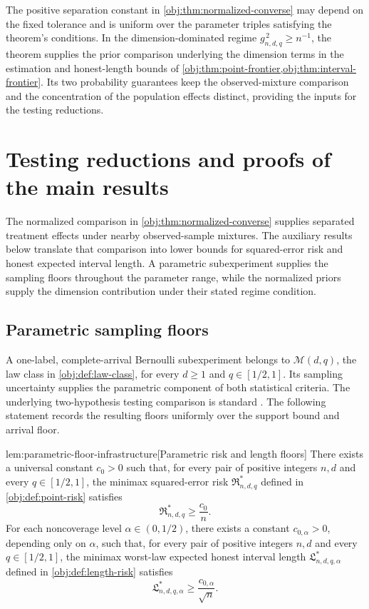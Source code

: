 \documentclass[11pt]{article}
\begin{document}
The positive separation constant  in \cref{obj:thm:normalized-converse} may depend on the fixed tolerance and is uniform over the parameter triples satisfying the theorem's conditions. In the dimension-dominated regime \(g_{n,d,q}^{\,2}\ge n^{-1}\), the theorem supplies the prior comparison underlying the dimension terms in the estimation and honest-length bounds of \cref{obj:thm:point-frontier,obj:thm:interval-frontier}. Its two probability guarantees keep the observed-mixture comparison and the concentration of the population effects distinct, providing the inputs for the testing reductions.


\section{Testing reductions and proofs of the main results}

The normalized comparison in \cref{obj:thm:normalized-converse} supplies separated treatment effects under nearby observed-sample mixtures. The auxiliary results below translate that comparison into lower bounds for squared-error risk and honest expected interval length. A parametric subexperiment supplies the sampling floors throughout the parameter range, while the normalized priors supply the dimension contribution under their stated regime condition.

\subsection{Parametric sampling floors}

A one-label, complete-arrival Bernoulli subexperiment belongs to \(\mathcal M(d,q)\), the law class in \cref{obj:def:law-class}, for every \(d\ge1\) and \(q\in[1/2,1]\). Its sampling uncertainty supplies the parametric component of both statistical criteria. The underlying two-hypothesis testing comparison is standard \citep[Theorem~2.2]{Tsybakov2009}. The following statement records the resulting floors uniformly over the support bound and arrival floor.

\begin{lemmav}{lem:parametric-floor-infrastructure}[Parametric risk and length floors]
There exists a universal constant \(c_0>0\) such that, for every pair of positive integers \(n,d\) and every \(q\in[1/2,1]\), the minimax squared-error risk \(\mathfrak R^*_{n,d,q}\) defined in \cref{obj:def:point-risk} satisfies
\[
\mathfrak R^*_{n,d,q}\ge \frac{c_0}{n}.
\]
For each noncoverage level \(\alpha\in(0,1/2)\), there exists a constant \(c_{0,\alpha}>0\), depending only on \(\alpha\), such that, for every pair of positive integers \(n,d\) and every \(q\in[1/2,1]\), the minimax worst-law expected honest interval length \(\mathfrak L^*_{n,d,q,\alpha}\) defined in \cref{obj:def:length-risk} satisfies
\[
\mathfrak L^*_{n,d,q,\alpha}\ge \frac{c_{0,\alpha}}{\sqrt n}.
\]
\end{lemmav}
\end{document}
